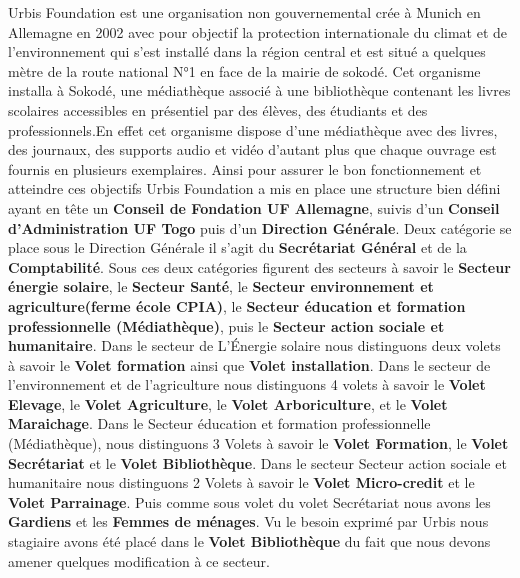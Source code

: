 \documentclass[12pt,a4paper]{article}
\begin{document}
Urbis Foundation est une organisation non gouvernemental crée à Munich en Allemagne en 2002 avec pour objectif la protection internationale du climat et de l’environnement qui s'est installé dans la région central et est situé a quelques mètre de la route national N°1 en face de la mairie de sokodé. Cet organisme installa à Sokodé, une médiathèque associé à une bibliothèque contenant les livres scolaires accessibles en présentiel par des élèves, des étudiants et des professionnels.En effet cet organisme dispose d'une médiathèque avec des livres, des journaux, des supports audio et vidéo d'autant plus que chaque ouvrage est fournis en plusieurs exemplaires. Ainsi pour assurer le bon fonctionnement et atteindre ces objectifs Urbis Foundation a mis en place une structure bien défini ayant en tête un \textbf{Conseil de Fondation UF Allemagne}, suivis d'un \textbf{Conseil d’Administration UF Togo} puis d'un \textbf{Direction Générale}. Deux catégorie se place sous le Direction Générale il s'agit du \textbf{Secrétariat Général} et de la \textbf{Comptabilité}. Sous ces deux catégories figurent des secteurs à savoir le \textbf{Secteur énergie solaire}, le \textbf{Secteur Santé}, le \textbf{Secteur environnement et agriculture(ferme école CPIA)}, le \textbf{Secteur éducation et formation professionnelle (Médiathèque)}, puis le \textbf{Secteur action sociale et humanitaire}. Dans le secteur de L’Énergie solaire nous distinguons deux volets à savoir le \textbf{Volet formation} ainsi que \textbf{Volet installation}. Dans le secteur de l'environnement et de l'agriculture nous distinguons 4 volets à savoir le \textbf{Volet Elevage}, le \textbf{Volet Agriculture}, le \textbf{Volet Arboriculture}, et le \textbf{Volet Maraichage}. Dans le Secteur éducation et formation professionnelle (Médiathèque), nous distinguons 3 Volets à savoir le \textbf{Volet Formation}, le \textbf{Volet Secrétariat} et le \textbf{Volet Bibliothèque}. Dans le secteur Secteur action sociale et humanitaire nous distinguons 2 Volets à savoir le \textbf{Volet Micro-credit} et le \textbf{Volet Parrainage}. Puis comme sous volet du volet Secrétariat nous avons les \textbf{Gardiens} et les \textbf{Femmes de ménages}. Vu le besoin exprimé par Urbis nous stagiaire avons été placé dans le \textbf{Volet Bibliothèque} du fait que nous devons amener quelques modification à ce secteur.\\
\end{document}
